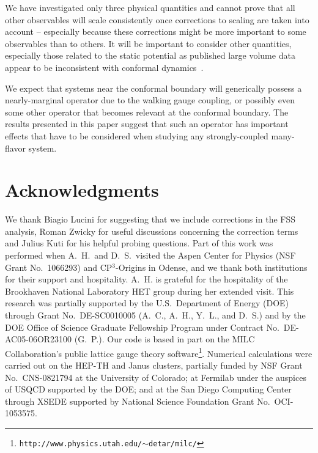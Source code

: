 \documentclass[aps,prl,twocolumn,]{revtex4-1}  %
\begin{document}
We have investigated only three physical quantities and cannot prove that all other observables will scale consistently once corrections to scaling are taken into account -- especially because these corrections might be more important to some observables than to others. 
It will  be important to consider other quantities, especially  those related to the static potential as published large volume data appear to be inconsistent with conformal dynamics~\cite{Fodor:2012uw}. 

We expect that systems near the conformal boundary will generically possess a nearly-marginal operator due to the walking gauge coupling, or possibly even some other operator that becomes relevant  at the conformal boundary. 
The results presented in this paper suggest that such an operator has important effects that have to be considered when studying  any strongly-coupled many-flavor system.



\section*{Acknowledgments} %
We thank  Biagio Lucini for suggesting that we include corrections in the FSS analysis, Roman Zwicky for useful discussions concerning the correction terms and Julius Kuti for his helpful probing questions.
Part of this work was performed when A.~H.\ and D.~S.\ visited the Aspen Center for Physics (NSF Grant No.~1066293) and CP$^3$-Origins in Odense, and we thank both institutions for their support and hospitality. A.~H. is grateful for the hospitality of the Brookhaven National Laboratory HET group during her extended visit.
This research was partially supported by the U.S.~Department of Energy (DOE) through Grant No.~DE-SC0010005 (A.~C., A.~H., Y.~L., and D.~S.) and by the DOE Office of Science Graduate Fellowship Program under Contract No.~DE-AC05-06OR23100 (G.~P.).
Our code is based in part on the MILC Collaboration's public lattice gauge theory software\footnote{\texttt{http://www.physics.utah.edu/$\sim$detar/milc/}}.
Numerical calculations were carried out on the HEP-TH and Janus clusters, partially funded by NSF Grant No.~CNS-0821794  at the University of Colorado; at Fermilab under the auspices of USQCD supported by the DOE; and at the San Diego Computing Center through XSEDE supported by National Science Foundation Grant No.~OCI-1053575.



{\renewcommand{\baselinestretch}{0.86} %
%  
  
}
\end{document}
